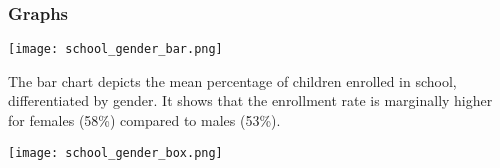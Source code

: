 \documentclass[10pt]{article}
\begin{document}
 \subsubsection{Graphs}
 \begin{center}
      \texttt{[image: school\_gender\_bar.png]}
 \end{center}
The bar chart depicts the mean percentage of children enrolled in school, differentiated by gender. It shows that the enrollment rate is marginally higher for females (58\%) compared to males (53\%).

 \begin{center}
      \texttt{[image: school\_gender\_box.png]}
 \end{center}
\end{document}
